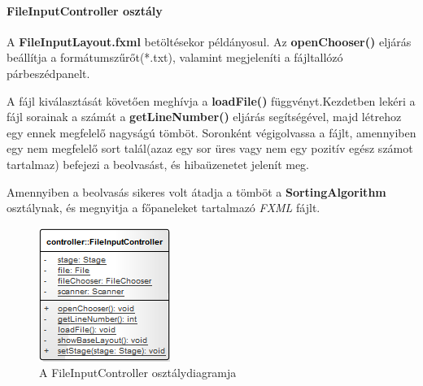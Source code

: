 \documentclass{elteikthesis}
\begin{document}
\paragraph{FileInputController osztály}
A \textbf{FileInputLayout.fxml} betöltésekor példányosul. Az \textbf{openChooser()} eljárás beállítja a formátumszűrőt(*.txt), valamint megjeleníti a fájltallózó párbeszédpanelt.\par A fájl kiválasztását követően meghívja a \textbf{loadFile()} függvényt.Kezdetben lekéri a fájl sorainak a számát a \textbf{getLineNumber()} eljárás segítségével, majd létrehoz egy ennek megfelelő nagyságú tömböt. Soronként végigolvassa a fájlt, amennyiben egy nem megfelelő sort talál(azaz egy sor üres vagy nem egy pozitív egész számot tartalmaz) befejezi a beolvasást, és hibaüzenetet jelenít meg.\par Amennyiben a beolvasás sikeres volt átadja a tömböt a \textbf{SortingAlgorithm} osztálynak, és megnyitja a főpaneleket tartalmazó \emph{FXML} fájlt.
\begin{figure}[H]
	\centering
	\includegraphics{pics/class/FileInputController.png}
	\caption{A FileInputController osztálydiagramja}
\end{figure}
\end{document}
